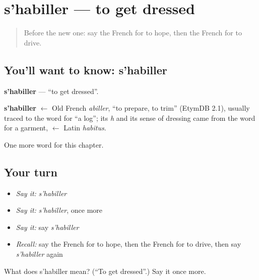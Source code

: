 \section[s'habiller]{s'habiller — to get dressed}

\label{lesson:FR-C138-shabiller}



\begin{quote}
Before the new one: say the French for to hope, then the French for to drive.
\end{quote}

\subsection*{You'll want to know: s'habiller}
\textbf{s'habiller} — \textquotedblleft{}to get dressed\textquotedblright{}.

\begin{cousinweb}
\textbf{s'habiller} $\leftarrow$ Old French \emph{abiller}, \textquotedblleft{}to prepare, to trim\textquotedblright{} (EtymDB 2.1), usually traced to the word for \textquotedblleft{}a log\textquotedblright{}; its \emph{h} and its sense of dressing came from the word for a garment, $\leftarrow$ Latin \emph{habitus}.
\end{cousinweb}

\begin{grammarlens}[title={What you've built}]
One more word for this chapter.
\end{grammarlens}

\subsection*{Your turn}
\begin{itemize}
\raggedright
  \item \emph{Say it:} \emph{s'habiller}
  \item \emph{Say it:} \emph{s'habiller}, once more
  \item \emph{Say it:} say \emph{s'habiller}
  \item \emph{Recall:} say the French for to hope, then the French for to drive, then say \emph{s'habiller} again
\end{itemize}

\begin{tcolorbox}[breakable,colback=teal!4,colframe=teal!35!black,title={Before you move on}]
What does s'habiller mean? (\textquotedblleft{}To get dressed\textquotedblright{}.) Say it once more.
\end{tcolorbox}
